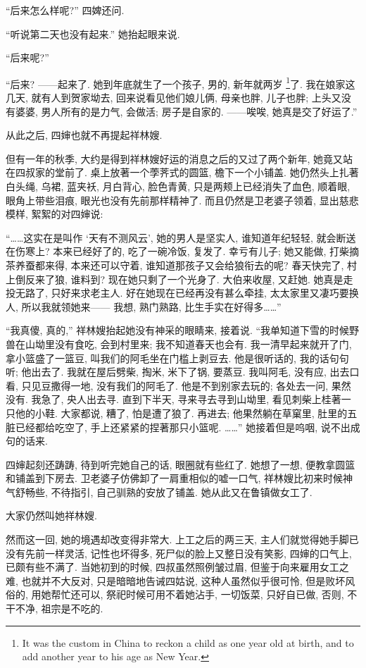``后来怎么样呢?''
四婢还问.

``听说第二天也没有起来.''
她抬起眼来说.

``后来呢?''

``后来? ——起来了.
她到年底就生了一个孩子, 男的, 新年就两岁%
\footnote{It was the custom in China
    to reckon a child as one year old at birth,
    and to add another year to his age as New Year.}了.
我在娘家这几天, 就有人到贺家坳去,
回来说看见他们娘儿俩, 母亲也胖, 儿子也胖;
上头又没有婆婆, 男人所有的是力气, 会做活;
房子是自家的.
——唉唉, 她真是交了好运了.''

从此之后, 四婶也就不再提起祥林嫂.

但有一年的秋季, 大约是得到祥林嫂好运的消息之后的又过了两个新年,
她竟又站在四叔家的堂前了.
桌上放著一个荸荠式的圆篮, 檐下一个小铺盖.
她仍然头上扎著白头绳, 乌裙, 蓝夹袄, 月白背心, 脸色青黄,
只是两颊上已经消失了血色, 顺着眼,
眼角上带些泪痕, 眼光也没有先前那样精神了.
而且仍然是卫老婆子领着, 显出慈悲模样, 絮絮的对四婶说:

``……这实在是叫作 `天有不测风云',
她的男人是坚实人, 谁知道年纪轻轻, 就会断送在伤寒上?
本来已经好了的, 吃了一碗冷饭, 复发了.
幸亏有儿子;
她又能做, 打柴摘茶养蚕都来得, 本来还可以守着,
谁知道那孩子又会给狼衔去的呢?
春天快完了, 村上倒反来了狼, 谁料到?
现在她只剩了一个光身了.
大伯来收屋, 又赶她.
她真是走投无路了, 只好来求老主人.
好在她现在已经再没有甚么牵挂,
太太家里又凄巧要换人,
所以我就领她来——%
我想, 熟门熟路, 比生手实在好得多……''

``我真傻, 真的,''
祥林嫂抬起她没有神采的眼睛来, 接着说.
``我单知道下雪的时候野兽在山坳里没有食吃, 会到村里来;
我不知道春天也会有.
我一清早起来就开了门, 拿小篮盛了一篮豆,
叫我们的阿毛坐在门槛上剥豆去.
他是很听话的, 我的话句句听;
他出去了.
我就在屋后劈柴, 掏米, 米下了锅, 要蒸豆.
我叫阿毛, 没有应,
出去口看, 只见豆撒得一地, 没有我们的阿毛了.
他是不到别家去玩的;
各处去一问, 果然没有.
我急了, 央人出去寻.
直到下半天, 寻来寻去寻到山坳里, 看见刺柴上桂著一只他的小鞋.
大家都说, 糟了, 怕是遭了狼了.
再进去;
他果然躺在草窠里, 肚里的五脏已经都给吃空了,
手上还紧紧的捏著那只小篮呢.
……''
她接着但是呜咽, 说不出成句的话来.

四婶起刻还踌踌, 待到听完她自己的话, 眼圈就有些红了.
她想了一想, 便教拿圆篮和铺盖到下房去.
卫老婆子仿佛卸了一肩重相似的嘘一口气,
祥林嫂比初来时候神气舒畅些, 不待指引, 自己驯熟的安放了铺盖.
她从此又在鲁镇做女工了.

大家仍然叫她祥林嫂.

然而这一回, 她的境遇却改变得非常大.
上工之后的两三天, 主人们就觉得她手脚已没有先前一样灵活,
记性也坏得多, 死尸似的脸上又整日没有笑影,
四婶的口气上, 已颇有些不满了.
当她初到的时候, 四叔虽然照例皱过眉,
但鉴于向来雇用女工之难, 也就并不大反对,
只是暗暗地告诫四姑说,
这种人虽然似乎很可怜, 但是败坏风俗的,
用她帮忙还可以, 祭祀时候可用不着她沾手,
一切饭菜, 只好自已做,
否则, 不干不净, 祖宗是不吃的.

